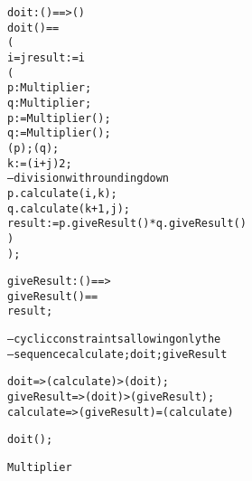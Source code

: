 \documentclass[\pformat,12pt]{article}
\begin{document}
\begin{description}
\begin{alltt}
    doit : () ==> ()
    doit() ==
      (
         i = j  result := i
        (
          p : Multiplier;
          q : Multiplier;
         p :=  Multiplier();  
         q :=  Multiplier();  
         (p);(q);  
         k := (i + j)   2;
         -- division with rounding down
         p.calculate(i,k);  
         q.calculate(k+1,j);  
         result := p.giveResult() *  q.giveResult ()
        )
      );

     giveResult : () ==> 
    giveResult() ==  
       result;

    -- cyclic constraints allowing only the 
    -- sequence calculate; doit; giveResult

     doit =>  (calculate) > (doit);
     giveResult =>  (doit) >  (giveResult);
     calculate =>  (giveResult) =  (calculate)

      doit();

     Multiplier
\end{alltt}

        


\end{description}
\end{document}
